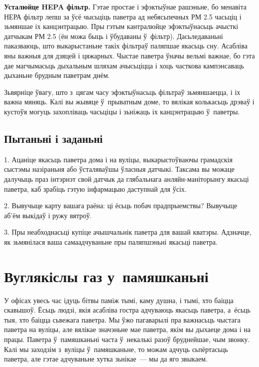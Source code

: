 \textbf{Усталюйце HEPA фільтр.} Гэтае простае і эфэктыўнае рашэньне, бо менавіта НЕРА фільтр лепш за ўсё чысьціць паветра ад небясьпечных РМ 2.5 часьціц і зьмяншае іх канцэнтрацыю. Пры гэтым кантралюйце эфэктыўнасьць ачысткі датчыкам РМ 2.5 (ён можа быць і ўбудаваны ў~фільтр). Дасьледаваньні паказваюць, што выкарыстаньне такіх фільтраў паляпшае якасьць сну. Асабліва яны важныя для дзяцей і цяжарных. Чыстае паветра ўначы вельмі важнае, бо гэта дае магчымасьць дыхальным шляхам ачысьціцца і хоць часткова кампэнсаваць дыханьне брудным паветрам днём.

Зьвярніце ўвагу, што з~цягам часу эфэктыўнасьць фільтраў зьмяншаецца, і іх важна мяняць. Калі вы жывяце ў~прыватным доме, то вялікая колькасьць дрэваў і кустоўя могуць захопліваць часьціцы і зьніжаць іх канцэнтрацыю ў~паветры.

\subsection*{Пытаньні і заданьні}

1. Ацаніце якасьць паветра дома і на вуліцы, выкарыстоўваючы грамадскія сыстэмы назіраньня або ўсталяваўшы ўласныя датчыкі. Таксама вы можаце далучыць праз інтэрнэт свой датчык да глябальнага анляйн-маніторынгу якасьці паветра, каб зрабіць гэтую інфармацыю даступнай для ўсіх.

2. Вывучыце карту вашага раёна: ці ёсьць побач прадпрыемствы? Вывучыце аб'ём выкідаў і ружу вятроў.

3. Пры неабходнасьці купіце ачышчальнік паветра для вашай кватэры. Адзначце, як зьмянілася ваша самаадчуваньне пры паляпшэньні якасьці паветра.


\section{Вуглякіслы газ у~памяшканьні}

У офісах увесь час ідуць бітвы паміж тымі, каму душна, і тымі, хто баіцца скавышоў. Ёсьць людзі, якія асабліва гостра адчуваюць якасьць паветра, а~ёсьць тыя, хто баіцца сьвежага паветра. Мы ўжо пагаварылі пра важнасьць чыстага паветра на вуліцы, але вялікае значэньне мае паветра, якім вы дыхаеце дома і на працы. Паветра ў~памяшканьні часта ў~некалькі разоў бруднейшае, чым звонку. Калі мы заходзім з~вуліцы ў~памяшканьне, то можам адчуць сьпёртасьць паветра, але гэтае адчуваньне хутка зьнікае~--- мы да яго звыкаем. 


